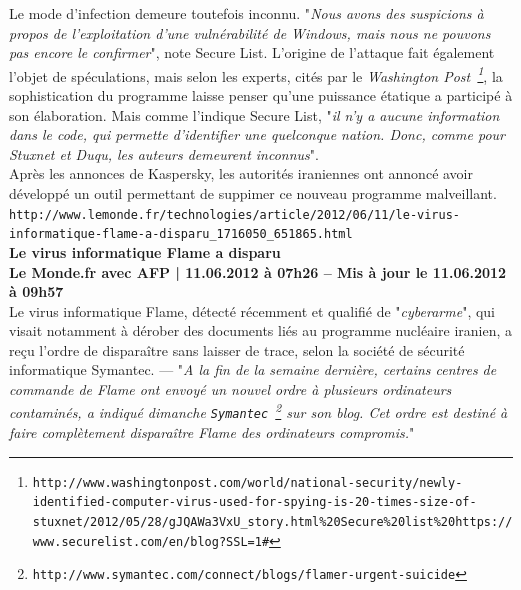 \documentclass[11pt,twoside,a4paper]{article}
\begin{document}
Le mode d'infection demeure toutefois inconnu. "\emph{Nous avons des suspicions {\`a} propos de l'exploitation d'une vuln{\'e}rabilit{\'e} de Windows, mais nous ne pouvons pas encore le confirmer}", note Secure List. L'origine de l'attaque fait {\'e}galement l'objet de sp{\'e}culations, mais selon les experts, cit{\'e}s par le \emph{Washington Post~\footnote{\texttt{http://www.washingtonpost.com/world/national-security/newly-identified-computer-virus-used-for-spying-is-20-times-size-of-stuxnet/2012/05/28/gJQAWa3VxU\_story.html\%20Secure\%20list\%20https://www.securelist.com/en/blog?SSL=1\#}}}, la sophistication du programme laisse penser qu'une puissance {\'e}tatique a particip{\'e} {\`a} son {\'e}laboration. Mais comme l'indique Secure List, "\emph{il n'y a aucune information dans le code, qui permette d'identifier une quelconque nation. Donc, comme pour Stuxnet et Duqu, les auteurs demeurent inconnus}".~\\

Apr{\`e}s les annonces de Kaspersky, les autorit{\'e}s iraniennes ont annonc{\'e} avoir d{\'e}velopp{\'e} un outil permettant de suppimer ce nouveau programme malveillant.~\\

\texttt{http://www.lemonde.fr/technologies/article/2012/06/11/le-virus-informatique-flame-a-disparu\_1716050\_651865.html}~\\

\textbf{\LARGE Le virus informatique Flame a disparu}~\\

\textbf{\small Le Monde.fr avec AFP | 11.06.2012 {\`a} 07h26 -- Mis {\`a} jour le 11.06.2012 {\`a} 09h57}~\\

Le virus informatique Flame, d{\'e}tect{\'e} r{\'e}cemment et qualifi{\'e} de "\emph{cyberarme}", qui visait notamment {\`a} d{\'e}rober des documents li{\'e}s au programme nucl{\'e}aire iranien, a re\c{c}u l'ordre de dispara{\^i}tre sans laisser de trace, selon la soci{\'e}t{\'e} de s{\'e}curit{\'e} informatique Symantec. --- "\emph{A la fin de la semaine derni{\`e}re, certains centres de commande de Flame ont envoy{\'e} un nouvel ordre {\`a} plusieurs ordinateurs contamin{\'e}s, a indiqu{\'e} dimanche \texttt{Symantec~\footnote{\texttt{http://www.symantec.com/connect/blogs/flamer-urgent-suicide}}} sur son blog. Cet ordre est destin{\'e} {\`a} faire compl{\`e}tement dispara{\^i}tre Flame des ordinateurs compromis.}"~\\
\end{document}
